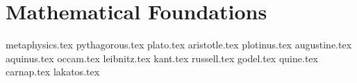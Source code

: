 \part{Mathematical Foundations}

{metaphysics.tex}
{pythagorous.tex}
{plato.tex}
{aristotle.tex}
{plotinus.tex}
{augustine.tex}
{aquinus.tex}
{occam.tex}
{leibnitz.tex}
{kant.tex}
{russell.tex}
{godel.tex}
{quine.tex}
{carnap.tex}
{lakatos.tex}